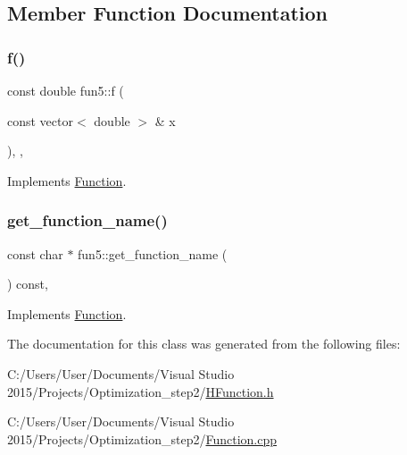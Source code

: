\subsection{Member Function Documentation}
\mbox{\label{classfun5_a8b68e41838f1055f14f1f5bd317fc84d}} 
\subsubsection{\texorpdfstring{f()}{f()}}
{\footnotesize\ttfamily const double fun5\+::f (\begin{DoxyParamCaption}\item[{const vector$<$ double $>$ \&}]{x }\end{DoxyParamCaption})\hspace{0.3cm}{\ttfamily [inline]}, {\ttfamily [override]}, {\ttfamily [virtual]}}



Implements \hyperlink{class_function_ae700c7cb44bd2048d712466767be2803}{Function}.

\mbox{\label{classfun5_af90356003e95287857dd39404ba3f232}} 
\subsubsection{\texorpdfstring{get\+\_\+function\+\_\+name()}{get\_function\_name()}}
{\footnotesize\ttfamily const char $\ast$ fun5\+::get\+\_\+function\+\_\+name (\begin{DoxyParamCaption}{ }\end{DoxyParamCaption}) const\hspace{0.3cm}{\ttfamily [override]}, {\ttfamily [virtual]}}



Implements \hyperlink{class_function_a928c579622c47d98e91477ef18dec199}{Function}.



The documentation for this class was generated from the following files\+:\begin{DoxyCompactItemize}
\item 
C\+:/\+Users/\+User/\+Documents/\+Visual Studio 2015/\+Projects/\+Optimization\+\_\+step2/\hyperlink{_h_function_8h}{H\+Function.\+h}\item 
C\+:/\+Users/\+User/\+Documents/\+Visual Studio 2015/\+Projects/\+Optimization\+\_\+step2/\hyperlink{_function_8cpp}{Function.\+cpp}\end{DoxyCompactItemize}
